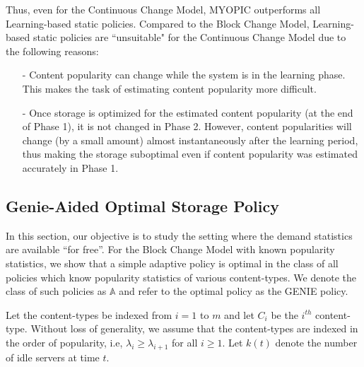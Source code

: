 \documentclass[10pt, conference, letterpaper]{IEEEtran}
\def \idle {k}
\begin{document}
Thus, even for the Continuous Change Model, MYOPIC outperforms all Learning-based static policies.  Compared to the Block Change Model, Learning-based static policies are ``unsuitable" for the Continuous Change Model due to the following reasons:
\begin{itemize}
	\item[-] Content popularity can change while the system is in the learning phase. This makes the task of estimating content popularity more difficult.
	\item[-] Once storage is optimized for the estimated content popularity (at the end of Phase 1), it is not changed in Phase 2. However, content popularities will change (by a small amount) almost instantaneously after the learning period, thus making the storage suboptimal even if content popularity was estimated accurately in Phase 1.
\end{itemize}


\subsection{Genie-Aided Optimal Storage Policy}
\label{subsec:optimal}

In this section, our objective is to study the setting where the
demand statistics are available ``for free''. For the Block Change Model with known popularity statistics, we show that a simple
adaptive policy is optimal in the class of all policies which know
popularity statistics of various content-types. We denote the class of
such policies as $\mathds{A}$ and refer to the optimal policy as the
GENIE policy.


\noindent Let the content-types be indexed from $i = 1$ to $m$ and let
$C_i$ be the $i^{th}$ content-type. Without loss of generality, we
assume that the content-types are indexed in the order of popularity,
i.e, $\lambda_i \geq \lambda_{i+1}$ for all $i \geq 1$. Let $\idle
(t)$ denote the number of idle servers at time $t$.
\end{document}
